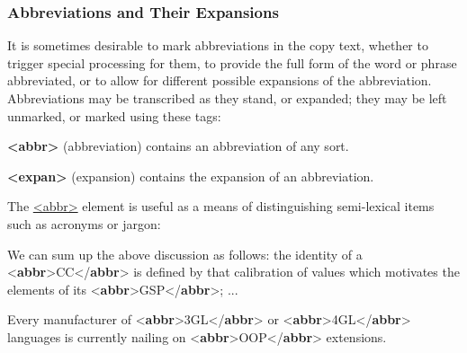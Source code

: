 \subsubsection[{Abbreviations and Their Expansions}]{Abbreviations and Their Expansions}\label{CONAAB}\par
It is sometimes desirable to mark abbreviations in the copy text, whether to trigger special processing for them, to provide the full form of the word or phrase abbreviated, or to allow for different possible expansions of the abbreviation. Abbreviations may be transcribed as they stand, or expanded; they may be left unmarked, or marked using these tags: 
\begin{sansreflist}
  
\item [\textbf{<abbr>}] (abbreviation) contains an abbreviation of any sort.
\item [\textbf{<expan>}] (expansion) contains the expansion of an abbreviation.
\end{sansreflist}
\par
The \hyperref[TEI.abbr]{<abbr>} element is useful as a means of distinguishing semi-lexical items such as acronyms or jargon: \par\bgroup{}\exampleFont \begin{shaded}\noindent\mbox{}We can sum up the above discussion as follows:\mbox{}\newline 
 the identity of a {<\textbf{abbr}>}CC{</\textbf{abbr}>} is defined by that calibration of values which\mbox{}\newline 
 motivates the elements of its {<\textbf{abbr}>}GSP{</\textbf{abbr}>}; ...\end{shaded}\egroup\par \noindent  \par\bgroup{}\exampleFont \begin{shaded}\noindent\mbox{}Every manufacturer of {<\textbf{abbr}>}3GL{</\textbf{abbr}>} or {<\textbf{abbr}>}4GL{</\textbf{abbr}>}\mbox{}\newline 
 languages is currently nailing on {<\textbf{abbr}>}OOP{</\textbf{abbr}>} extensions.\end{shaded}\egroup\par \par
